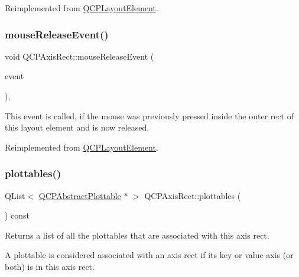 Reimplemented from \mbox{\hyperlink{class_q_c_p_layout_element_a2d82ea21fe0ee628f177bd824bc51a71}{Q\+C\+P\+Layout\+Element}}.

\mbox{\label{class_q_c_p_axis_rect_adf6c99780cea55ab39459a6eaad3a94a}} 
\subsubsection{\texorpdfstring{mouse\+Release\+Event()}{mouseReleaseEvent()}}
{\footnotesize\ttfamily void Q\+C\+P\+Axis\+Rect\+::mouse\+Release\+Event (\begin{DoxyParamCaption}\item[{Q\+Mouse\+Event $\ast$}]{event }\end{DoxyParamCaption})\hspace{0.3cm}{\ttfamily [protected]}, {\ttfamily [virtual]}}

This event is called, if the mouse was previously pressed inside the outer rect of this layout element and is now released. 

Reimplemented from \mbox{\hyperlink{class_q_c_p_layout_element_ae526ac828cce1e5bb94eaa85776d7404}{Q\+C\+P\+Layout\+Element}}.

\mbox{\label{class_q_c_p_axis_rect_a587d073a97b27bc7293fab4b2774ad59}} 
\subsubsection{\texorpdfstring{plottables()}{plottables()}}
{\footnotesize\ttfamily Q\+List$<$ \mbox{\hyperlink{class_q_c_p_abstract_plottable}{Q\+C\+P\+Abstract\+Plottable}} $\ast$ $>$ Q\+C\+P\+Axis\+Rect\+::plottables (\begin{DoxyParamCaption}{ }\end{DoxyParamCaption}) const}

Returns a list of all the plottables that are associated with this axis rect.

A plottable is considered associated with an axis rect if its key or value axis (or both) is in this axis rect.

